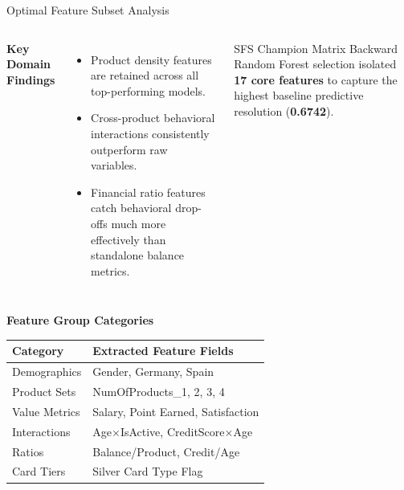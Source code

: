 \begin{frame}{Optimal Feature Subset Analysis}
    \footnotesize
\begin{columns}[T]
\textbf{Key Domain Findings}
\begin{itemize}\scriptsize
    \item Product density features are retained across all top-performing models.
    \item Cross-product behavioral interactions consistently outperform raw variables.
    \item Financial ratio features catch behavioral drop-offs much more effectively than standalone balance metrics.
\end{itemize}

\begin{block}{SFS Champion Matrix}
Backward Random Forest selection isolated \textbf{17 core features} to capture the highest baseline predictive resolution (\textbf{0.6742}).
\end{block}
\end{columns}

\centering
\textbf{Feature Group Categories}\\
\footnotesize
\begin{tabular}{ll}
\toprule
\textbf{Category} & \textbf{Extracted Feature Fields} \\
\midrule
Demographics & Gender, Germany, Spain \\
Product Sets & NumOfProducts\_1, 2, 3, 4 \\
Value Metrics & Salary, Point Earned, Satisfaction \\
Interactions & Age$\times$IsActive, CreditScore$\times$Age \\
Ratios & Balance/Product, Credit/Age \\
Card Tiers & Silver Card Type Flag \\
\bottomrule
\end{tabular}

\end{frame}
